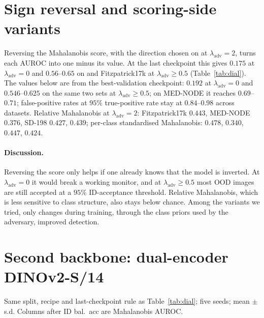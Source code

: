 \documentclass{midl}
\newcommand{\lam}{\lambda_{\mathrm{adv}}}
\begin{document}
\FloatBarrier
\section{Sign reversal and scoring-side variants}
\label{app:flip}

Reversing the Mahalanobis score, with the direction chosen on \texttt{} at $\lam=2$,
turns each AUROC into one minus its value. At the last checkpoint this gives $0.175$ at $\lam=0$ and
$0.56$--$0.65$ on \texttt{} and Fitzpatrick17k at $\lam\ge0.5$ (Table~\ref{tab:dial}).
The values below are from the best-validation checkpoint: $0.192$ at $\lam=0$ and $0.546$--$0.625$ on the
same two sets at $\lam\ge0.5$; on MED-NODE it reaches $0.69$--$0.71$; false-positive rates at $95\%$
true-positive rate stay at $0.84$--$0.98$ across datasets. Relative
Mahalanobis at $\lam=2$: Fitzpatrick17k $0.443$, MED-NODE $0.376$, SD-198 $0.427$,
\texttt{} $0.439$; per-class standardised Mahalanobis: $0.478$, $0.340$, $0.447$,
$0.424$.

\paragraph{Discussion.} Reversing the score only helps if one already knows that the model is inverted. At $\lam=0$
it would break a working monitor, and at $\lam\ge0.5$ most OOD images are still accepted at a
$95\%$ ID-acceptance threshold. Relative Mahalanobis, which is less sensitive to class
structure, also stays below chance. Among the variants we tried, only changes during training,
through the class priors used by the adversary, improved detection.

\FloatBarrier
\section{Second backbone: dual-encoder DINOv2-S/14}
\label{app:dino}

Same split, recipe and last-checkpoint rule as Table~\ref{tab:dial}; five seeds; mean $\pm$ s.d.
Columns after ID bal.\ acc are Mahalanobis AUROC.
\end{document}
